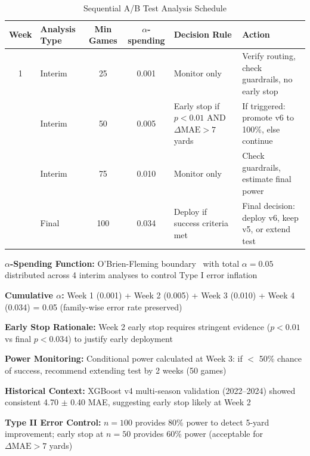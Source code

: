 \begin{table}[htbp]
\centering
\small
\caption{Sequential A/B Test Analysis Schedule}
\label{tab:ab-sequential-schedule}
\begin{tabular}{@{}clS[table-format=3.0]S[table-format=1.3]p{4.5cm}p{3.2cm}@{}}
\toprule
\textbf{Week} & \textbf{Analysis Type} & {\textbf{Min Games}} & {\textbf{$\alpha$-spending}} & \textbf{Decision Rule} & \textbf{Action} \\
 & Interim & 25 & {0.001} & Monitor only & Verify routing, check guardrails, no early stop \\
 & Interim & 50 & {0.005} & Early stop if $p < 0.01$ AND $\Delta\text{MAE} > 7$ yards & If triggered: promote v6 to 100\%, else continue \\
 & Interim & 75 & {0.010} & Monitor only & Check guardrails, estimate final power \\
 & Final & 100 & {0.034} & Deploy if success criteria met & Final decision: deploy v6, keep v5, or extend test \\
\bottomrule
\end{tabular}
\begin{tablenotes}
\item \textbf{$\alpha$-Spending Function:} O'Brien-Fleming boundary~\citep{obrien1979multiple} with total $\alpha = 0.05$ distributed across 4 interim analyses to control Type I error inflation
\item \textbf{Cumulative $\alpha$:} Week 1 (0.001) + Week 2 (0.005) + Week 3 (0.010) + Week 4 (0.034) = 0.05 (family-wise error rate preserved)
\item \textbf{Early Stop Rationale:} Week 2 early stop requires stringent evidence ($p < 0.01$ vs final $p < 0.034$) to justify early deployment
\item \textbf{Power Monitoring:} Conditional power calculated at Week 3: if $<$ 50\% chance of success, recommend extending test by 2 weeks (50 games)
\item \textbf{Historical Context:} XGBoost v4 multi-season validation (2022--2024) showed consistent 4.70 $\pm$ 0.40 MAE, suggesting early stop likely at Week 2
\item \textbf{Type II Error Control:} $n = 100$ provides 80\% power to detect 5-yard improvement; early stop at $n = 50$ provides 60\% power (acceptable for $\Delta\text{MAE} > 7$ yards)
\end{tablenotes}
\end{table}

